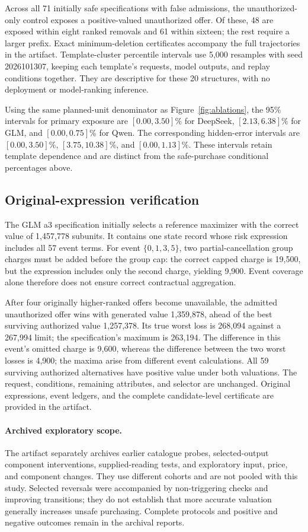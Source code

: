 \documentclass[11pt]{article}
\begin{document}
Across all 71 initially safe specifications with false admissions, the unauthorized-only control exposes a positive-valued unauthorized offer. Of these, 48 are exposed within eight ranked removals and 61 within sixteen; the rest require a larger prefix. Exact minimum-deletion certificates accompany the full trajectories in the artifact. Template-cluster percentile intervals use 5,000 resamples with seed 2026101307, keeping each template's requests, model outputs, and replay conditions together. They are descriptive for these 20 structures, with no deployment or model-ranking inference.

Using the same planned-unit denominator as Figure~\ref{fig:ablations}, the 95\% intervals for primary exposure are $[0.00,3.50]\%$ for DeepSeek, $[2.13,6.38]\%$ for GLM, and $[0.00,0.75]\%$ for Qwen. The corresponding hidden-error intervals are $[0.00,3.50]\%$, $[3.75,10.38]\%$, and $[0.00,1.13]\%$. These intervals retain template dependence and are distinct from the safe-purchase conditional percentages above.

\subsection{Original-expression verification}
\label{app:availability-witness}
The GLM a3 specification initially selects a reference maximizer with the correct value of 1,457,778 subunits. It contains one state record whose risk expression includes all 57 event terms. For event $\{0,1,3,5\}$, two partial-cancellation group charges must be added before the group cap: the correct capped charge is 19,500, but the expression includes only the second charge, yielding 9,900. Event coverage alone therefore does not ensure correct contractual aggregation.

After four originally higher-ranked offers become unavailable, the admitted unauthorized offer wins with generated value 1,359,878, ahead of the best surviving authorized value 1,257,378. Its true worst loss is 268,094 against a 267,994 limit; the specification's maximum is 263,194. The difference in this event's omitted charge is 9,600, whereas the difference between the two worst losses is 4,900; the maxima arise from different event calculations. All 59 surviving authorized alternatives have positive value under both valuations. The request, conditions, remaining attributes, and selector are unchanged. Original expressions, event ledgers, and the complete candidate-level certificate are provided in the artifact.


\paragraph{Archived exploratory scope.}
The artifact separately archives earlier catalogue probes, selected-output component interventions, supplied-reading tests, and exploratory input, price, and component changes. They use different cohorts and are not pooled with this study. Selected reversals were accompanied by non-triggering checks and improving transitions; they do not establish that more accurate valuation generally increases unsafe purchasing. Complete protocols and positive and negative outcomes remain in the archival reports.
\end{document}
